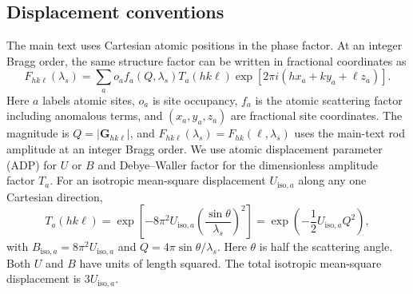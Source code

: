 \subsection{Displacement conventions}

The main text uses Cartesian atomic positions in the phase factor. At an integer Bragg order, the same structure factor can be written in fractional coordinates as
\begin{equation}
F_{hk\ell}(\lambda_s)=\sum_a o_a f_a(Q,\lambda_s)T_a(hk\ell)
\exp\!\left[2\pi i(hx_a+ky_a+\ell z_a)\right].
\label{eq:si_structure_factor_conventional}
\end{equation}
Here $a$ labels atomic sites, $o_a$ is site occupancy, $f_a$ is the atomic scattering factor including anomalous terms, and $(x_a,y_a,z_a)$ are fractional site coordinates. The magnitude is $Q=|\mathbf G_{hk\ell}|$, and $F_{hk\ell}(\lambda_s)=F_{hk}(\ell,\lambda_s)$ uses the main-text rod amplitude at an integer Bragg order. We use atomic displacement parameter (ADP) for $U$ or $B$ and Debye--Waller factor for the dimensionless amplitude factor $T_a$.\cite{Trueblood1996} For an isotropic mean-square displacement $U_{\mathrm{iso},a}$ along any one Cartesian direction,
\begin{equation}
T_a(hk\ell)
=\exp\!\left[-8\pi^2U_{\mathrm{iso},a}
\left(\frac{\sin\theta}{\lambda_s}\right)^2\right]
=\exp\!\left(-\frac12U_{\mathrm{iso},a}Q^2\right),
\label{eq:si_isotropic_displacement_factor}
\end{equation}
with $B_{\mathrm{iso},a}=8\pi^2U_{\mathrm{iso},a}$ and $Q=4\pi\sin\theta/\lambda_s$. Here $\theta$ is half the scattering angle. Both $U$ and $B$ have units of length squared. The total isotropic mean-square displacement is $3U_{\mathrm{iso},a}$.

